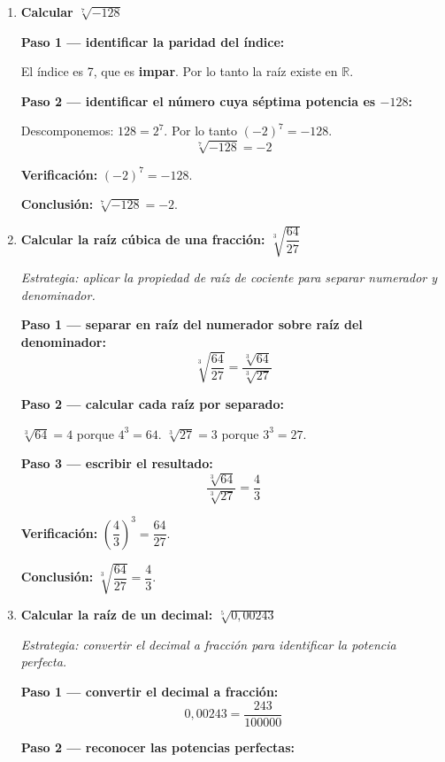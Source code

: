 \documentclass[11pt, letterpaper]{article}
\begin{document}
\begin{tcolorbox}[examplebox, title={Ejemplos}]
\begin{enumerate}[label=\textbf{Ej. \arabic*.}, leftmargin=*, itemsep=18pt]
\textbf{Conclusión:} $\sqrt[4]{-16}$ \textbf{no existe en $\mathbb{R}$}.

\item \textbf{Calcular $\sqrt[7]{-128}$}

\textbf{Paso 1 — identificar la paridad del índice:}

El índice es 7, que es \textbf{impar}. Por lo tanto la raíz existe en $\mathbb{R}$.

\textbf{Paso 2 — identificar el número cuya séptima potencia es $-128$:}

Descomponemos: $128 = 2^7$. Por lo tanto $(-2)^7 = -128$.
$$\sqrt[7]{-128} = -2$$

\textbf{Verificación:} $(-2)^7 = -128$. \checkmark

\textbf{Conclusión:} $\sqrt[7]{-128} = -2$.

\item \textbf{Calcular la raíz cúbica de una fracción: $\sqrt[3]{\dfrac{64}{27}}$}

\textit{Estrategia: aplicar la propiedad de raíz de cociente para separar numerador y denominador.}

\textbf{Paso 1 — separar en raíz del numerador sobre raíz del denominador:}
$$\sqrt[3]{\frac{64}{27}} = \frac{\sqrt[3]{64}}{\sqrt[3]{27}}$$

\textbf{Paso 2 — calcular cada raíz por separado:}

$\sqrt[3]{64} = 4$ porque $4^3 = 64$. \quad $\sqrt[3]{27} = 3$ porque $3^3 = 27$.

\textbf{Paso 3 — escribir el resultado:}
$$\frac{\sqrt[3]{64}}{\sqrt[3]{27}} = \frac{4}{3}$$

\textbf{Verificación:} $\left(\dfrac{4}{3}\right)^3 = \dfrac{64}{27}$. \checkmark

\textbf{Conclusión:} $\sqrt[3]{\dfrac{64}{27}} = \dfrac{4}{3}$.

\item \textbf{Calcular la raíz de un decimal: $\sqrt[5]{0{,}00243}$}

\textit{Estrategia: convertir el decimal a fracción para identificar la potencia perfecta.}

\textbf{Paso 1 — convertir el decimal a fracción:}
$$0{,}00243 = \frac{243}{100000}$$

\textbf{Paso 2 — reconocer las potencias perfectas:}


\end{enumerate}
\end{tcolorbox}
\end{document}
